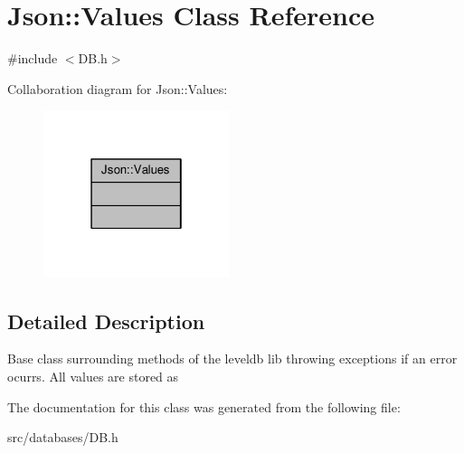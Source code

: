 \hypertarget{classJson_1_1Values}{}\section{Json\+:\+:Values Class Reference}
\label{classJson_1_1Values}


{\ttfamily \#include $<$D\+B.\+h$>$}



Collaboration diagram for Json\+:\+:Values\+:\nopagebreak
\begin{figure}[H]
\begin{center}
\leavevmode
\includegraphics[width=154pt]{d0/d8a/classJson_1_1Values__coll__graph}
\end{center}
\end{figure}


\subsection{Detailed Description}
Base class surrounding methods of the leveldb lib throwing exceptions if an error ocurrs. All values are stored as 

The documentation for this class was generated from the following file\+:\begin{DoxyCompactItemize}
\item 
src/databases/D\+B.\+h\end{DoxyCompactItemize}
